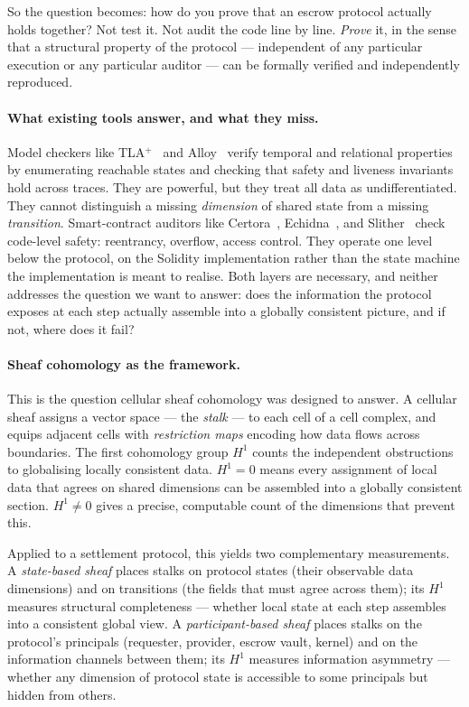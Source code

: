 \documentclass[11pt]{article}
\theoremstyle{plain}
\theoremstyle{definition}
\newcommand{\Hone}{H^{1}}
\begin{document}
So the question becomes: how do you prove that an escrow protocol actually
holds together?  Not test it.  Not audit the code line by line.  \emph{Prove}
it, in the sense that a structural property of the protocol --- independent
of any particular execution or any particular auditor --- can be formally
verified and independently reproduced.

\paragraph{What existing tools answer, and what they miss.}
Model checkers like TLA$^+$~\cite{Lamport2002} and Alloy~\cite{Jackson2012}
verify temporal and relational properties by enumerating reachable states and
checking that safety and liveness invariants hold across traces.  They are
powerful, but they treat all data as undifferentiated.  They cannot
distinguish a missing \emph{dimension} of shared state from a missing
\emph{transition}.  Smart-contract auditors like
Certora~\cite{Certora2026}, Echidna~\cite{Echidna2020}, and
Slither~\cite{Slither2019} check code-level safety: reentrancy, overflow,
access control.  They
operate one level below the protocol, on the Solidity implementation rather
than the state machine the implementation is meant to realise.  Both layers
are necessary, and neither addresses the question we want to answer: does the
information the protocol exposes at each step actually assemble into a
globally consistent picture, and if not, where does it fail?

\paragraph{Sheaf cohomology as the framework.}
This is the question cellular sheaf cohomology was designed to answer.  A
cellular sheaf assigns a vector space --- the \emph{stalk} --- to each cell of
a cell complex, and equips adjacent cells with \emph{restriction maps}
encoding how data flows across boundaries.  The first cohomology group
$\Hone$ counts the independent obstructions to globalising locally consistent
data.  $\Hone = 0$ means every assignment of local data that agrees on shared
dimensions can be assembled into a globally consistent section.  $\Hone \neq
0$ gives a precise, computable count of the dimensions that prevent this.

Applied to a settlement protocol, this yields two complementary measurements.
A \emph{state-based sheaf} places stalks on protocol states (their observable
data dimensions) and on transitions (the fields that must agree across them);
its $\Hone$ measures structural completeness --- whether local state at each
step assembles into a consistent global view.  A \emph{participant-based
sheaf} places stalks on the protocol's principals (requester, provider,
escrow vault, kernel) and on the information channels between them; its
$\Hone$ measures information asymmetry --- whether any dimension of protocol
state is accessible to some principals but hidden from others.
\end{document}
